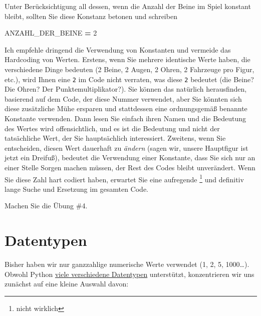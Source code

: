 \documentclass[
]{book}
\newenvironment{Shaded}{\begin{snugshade}}{\end{snugshade}}
\newcommand{\DecValTok}[1]{\textcolor[rgb]{0.00,0.00,0.81}{#1}}
\newcommand{\NormalTok}[1]{#1}
\newcommand{\OperatorTok}[1]{\textcolor[rgb]{0.81,0.36,0.00}{\textbf{#1}}}
\begin{document}
Unter Berücksichtigung all dessen, wenn die Anzahl der Beine im Spiel konstant bleibt, sollten Sie diese Konstanz betonen und schreiben

\begin{Shaded}
\begin{Highlighting}[]
\NormalTok{ANZAHL\_DER\_BEINE }\OperatorTok{=} \DecValTok{2}
\end{Highlighting}
\end{Shaded}

Ich empfehle dringend die Verwendung von Konstanten und vermeide das Hardcoding von Werten. Erstens, wenn Sie mehrere identische Werte haben, die verschiedene Dinge bedeuten (2 Beine, 2 Augen, 2 Ohren, 2 Fahrzeuge pro Figur, etc.), wird Ihnen eine \texttt{2} im Code nicht verraten, was diese \texttt{2} bedeutet (die Beine? Die Ohren? Der Punktemultiplikator?). Sie können das natürlich herausfinden, basierend auf dem Code, der diese Nummer verwendet, aber Sie könnten sich diese zusätzliche Mühe ersparen und stattdessen eine ordnungsgemäß benannte Konstante verwenden. Dann lesen Sie einfach ihren Namen und die Bedeutung des Wertes wird offensichtlich, und es ist die Bedeutung und nicht der tatsächliche Wert, der Sie hauptsächlich interessiert. Zweitens, wenn Sie entscheiden, diesen Wert dauerhaft zu \emph{ändern} (sagen wir, unsere Hauptfigur ist jetzt ein Dreifuß), bedeutet die Verwendung einer Konstante, dass Sie sich nur an einer Stelle Sorgen machen müssen, der Rest des Codes bleibt unverändert. Wenn Sie diese Zahl hart codiert haben, erwartet Sie eine aufregende \footnote{nicht wirklich} und definitiv lange Suche und Ersetzung im gesamten Code.

Machen Sie die Übung \#4.

\hypertarget{value-types}{%
\section{Datentypen}\label{value-types}}

Bisher haben wir nur ganzzahlige numerische Werte verwendet (1, 2, 5, 1000\ldots). Obwohl Python \href{https://docs.python.org/3/library/stdtypes.html}{viele verschiedene Datentypen} unterstützt, konzentrieren wir uns zunächst auf eine kleine Auswahl davon:
\end{document}
